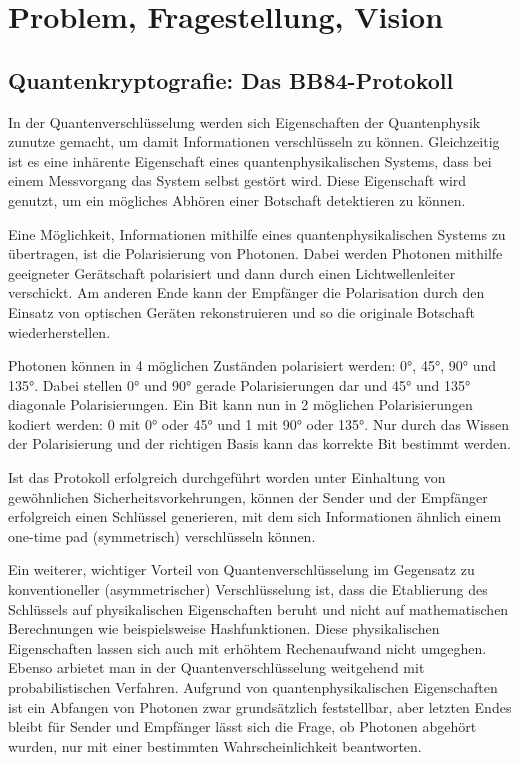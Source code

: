 \documentclass[a4paper,10.2pt,pdftex]{scrartcl}%
\begin{document}
\section{Problem, Fragestellung, Vision}
\subsection{Quantenkryptografie: Das BB84-Protokoll} 
In der Quantenverschlüsselung werden sich Eigenschaften der Quantenphysik zunutze gemacht, um damit Informationen verschlüsseln zu können. Gleichzeitig ist es eine inhärente Eigenschaft eines quantenphysikalischen Systems, dass bei einem Messvorgang das System selbst gestört wird. Diese Eigenschaft wird genutzt, um ein mögliches Abhören einer Botschaft detektieren zu können.

Eine Möglichkeit, Informationen mithilfe eines quantenphysikalischen Systems zu übertragen, ist die Polarisierung von Photonen. Dabei werden Photonen mithilfe geeigneter Gerätschaft polarisiert und dann durch einen Lichtwellenleiter verschickt. Am anderen Ende kann der Empfänger die Polarisation durch den Einsatz von optischen Geräten rekonstruieren und so die originale Botschaft wiederherstellen.

Photonen können in 4 möglichen Zuständen polarisiert werden: 0°, 45°, 90° und 135°. Dabei stellen 0° und 90° gerade Polarisierungen dar und 45° und 135° diagonale Polarisierungen. Ein Bit kann nun in 2 möglichen Polarisierungen kodiert werden: 0 mit 0° oder 45° und 1 mit 90° oder 135°. Nur durch das Wissen der Polarisierung und der richtigen Basis kann das korrekte Bit bestimmt werden.

Ist das Protokoll erfolgreich durchgeführt worden unter Einhaltung von gewöhnlichen Sicherheitsvorkehrungen, können der Sender und der Empfänger erfolgreich einen Schlüssel generieren, mit dem sich Informationen ähnlich einem one-time pad (symmetrisch) verschlüsseln können. 

Ein weiterer, wichtiger Vorteil von Quantenverschlüsselung im Gegensatz zu konventioneller (asymmetrischer) Verschlüsselung ist, dass die Etablierung des Schlüssels auf physikalischen Eigenschaften beruht und nicht auf mathematischen Berechnungen wie beispielsweise Hashfunktionen. Diese physikalischen Eigenschaften lassen sich auch mit erhöhtem Rechenaufwand nicht umgeghen. Ebenso arbietet man in der Quantenverschlüsselung weitgehend mit probabilistischen Verfahren. Aufgrund von quantenphysikalischen Eigenschaften ist ein Abfangen von Photonen zwar grundsätzlich feststellbar, aber letzten Endes bleibt für Sender und Empfänger lässt sich die Frage, ob Photonen abgehört wurden, nur mit einer bestimmten Wahrscheinlichkeit beantworten. 
\end{document}
